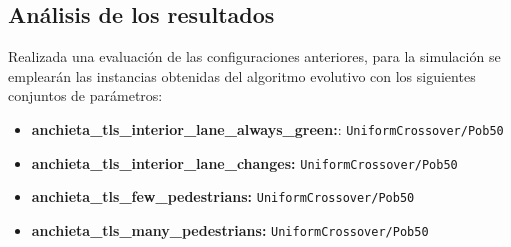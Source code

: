 \subsection{Análisis de los resultados}

Realizada una evaluación de las configuraciones anteriores, para la simulación se emplearán las instancias obtenidas del algoritmo evolutivo con los siguientes conjuntos de parámetros:

\begin{itemize}
    \item \textbf{anchieta\_tls\_interior\_lane\_always\_green:}: \texttt{UniformCrossover/Pob50}
    \item \textbf{anchieta\_tls\_interior\_lane\_changes:} \texttt{UniformCrossover/Pob50}
    \item \textbf{anchieta\_tls\_few\_pedestrians:} \texttt{UniformCrossover/Pob50}
    \item \textbf{anchieta\_tls\_many\_pedestrians:} \texttt{UniformCrossover/Pob50}
\end{itemize}




